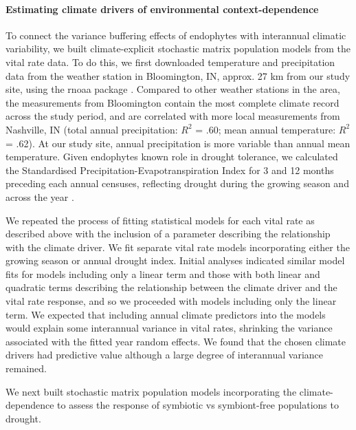 \documentclass[12pt]{article}
\begin{document}
\paragraph*{Estimating climate drivers of environmental context-dependence}
To connect the variance buffering effects of endophytes with interannual climatic variability, we built climate-explicit stochastic matrix population models from the vital rate data.
To do this, we first downloaded temperature and precipitation data from the weather station in Bloomington, IN,  approx. 27 km from our study site, using the rnoaa package \cite{chamberlain2022package}. 
Compared to other weather stations in the area, the measurements from Bloomington contain the most complete climate record across the study period, and are correlated with more local measurements from Nashville, IN (total annual precipitation: $R^2$ = .60; mean annual temperature: $R^2$ = .62).
At our study site, annual precipitation is more variable than annual mean temperature.
Given endophytes known role in drought tolerance, we calculated the Standardised Precipitation-Evapotranspiration Index for 3 and 12 months preceding each annual censuses, reflecting drought during the growing season and across the year \cite{vicente2010multiscalar}.

We repeated the process of fitting statistical models for each vital rate as described above with the inclusion of a parameter describing the relationship with the climate driver. 
We fit separate vital rate models incorporating either the growing season or annual drought index.  
Initial analyses indicated similar model fits for models including only a linear term and those with both linear and  quadratic terms describing the relationship between the climate driver and the vital rate response, and so we proceeded with models including only the linear term.
We expected that including annual climate predictors into the models would explain some interannual variance in vital rates, shrinking the variance associated with the fitted year random effects.
We found that the chosen climate drivers had predictive value although a large degree of interannual variance remained. 

We next built stochastic matrix population models incorporating the climate-dependence to assess the response of symbiotic vs symbiont-free populations to drought. 




\end{document}
